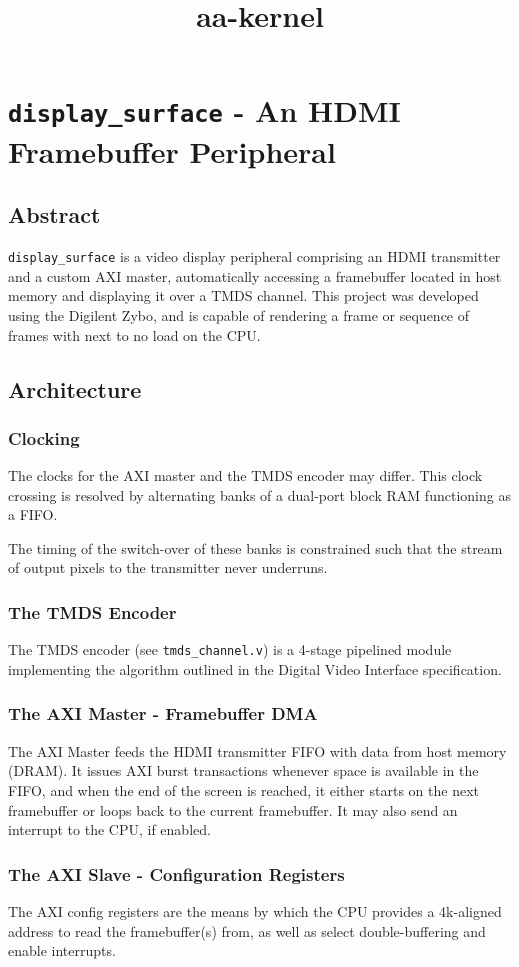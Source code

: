 \documentclass[a4paper,12pt]{refrep}
\title{aa-kernel}
\newcommand{\code}[1]{\colorbox{light-gray}{\texttt{#1}}}
\begin{document}
\chapter{\code{display\_surface} - An HDMI Framebuffer Peripheral}

\section{Abstract}
\code{display\_surface} is a video display peripheral comprising an 
HDMI transmitter and a custom AXI master, 
automatically accessing a framebuffer located in host memory 
and displaying it over a TMDS channel. This project was developed
using the Digilent Zybo, and is capable of rendering a frame 
or sequence of frames with next to no load on the CPU.

\section{Architecture}
\subsection{Clocking}
The clocks for the AXI master and the TMDS encoder may differ. 
This clock crossing is resolved by alternating banks 
of a dual-port block RAM functioning as a FIFO.

The timing of the switch-over of these banks is constrained 
such that the stream of output pixels to the transmitter never 
underruns.

\subsection{The TMDS Encoder}
The TMDS encoder (see \code{tmds\_channel.v}) is a 4-stage pipelined 
module implementing the algorithm outlined in the Digital 
Video Interface specification. 

\subsection{The AXI Master - Framebuffer DMA}
The AXI Master feeds the HDMI transmitter FIFO with data from host 
memory (DRAM). It issues AXI burst transactions whenever space is
available in the FIFO, and when the end of the screen is reached,
it either starts on the next framebuffer or loops back to the 
current framebuffer. It may also send an interrupt to the CPU, 
if enabled.
\subsection{The AXI Slave - Configuration Registers}
The AXI config registers are the means by which the CPU provides a 
4k-aligned address to read the framebuffer(s) from, as well as select
double-buffering and enable interrupts. 
\end{document}
